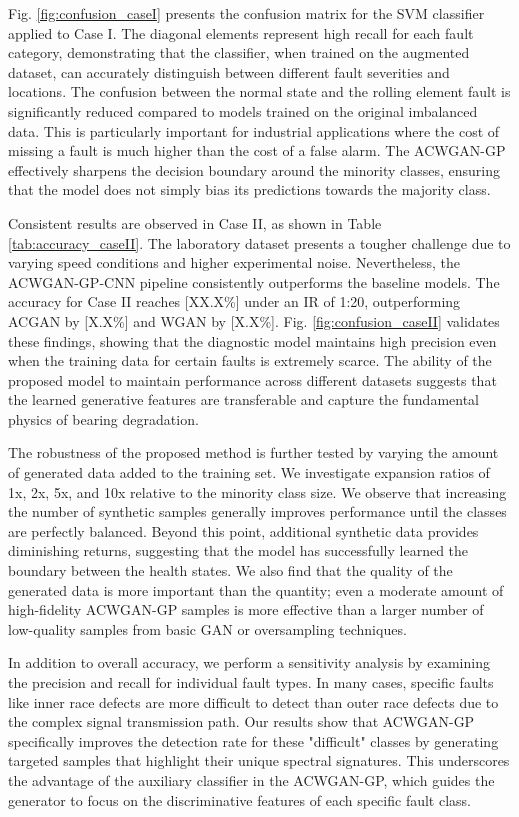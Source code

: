Fig. \ref{fig:confusion_caseI} presents the confusion matrix for the SVM classifier applied to Case I. The diagonal elements represent high recall for each fault category, demonstrating that the classifier, when trained on the augmented dataset, can accurately distinguish between different fault severities and locations. The confusion between the normal state and the rolling element fault is significantly reduced compared to models trained on the original imbalanced data. This is particularly important for industrial applications where the cost of missing a fault is much higher than the cost of a false alarm. The ACWGAN-GP effectively sharpens the decision boundary around the minority classes, ensuring that the model does not simply bias its predictions towards the majority class.

Consistent results are observed in Case II, as shown in Table \ref{tab:accuracy_caseII}. The laboratory dataset presents a tougher challenge due to varying speed conditions and higher experimental noise. Nevertheless, the ACWGAN-GP-CNN pipeline consistently outperforms the baseline models. The accuracy for Case II reaches [XX.X\%] under an IR of 1:20, outperforming ACGAN by [X.X\%] and WGAN by [X.X\%]. Fig. \ref{fig:confusion_caseII} validates these findings, showing that the diagnostic model maintains high precision even when the training data for certain faults is extremely scarce. The ability of the proposed model to maintain performance across different datasets suggests that the learned generative features are transferable and capture the fundamental physics of bearing degradation.

The robustness of the proposed method is further tested by varying the amount of generated data added to the training set. We investigate expansion ratios of 1x, 2x, 5x, and 10x relative to the minority class size. We observe that increasing the number of synthetic samples generally improves performance until the classes are perfectly balanced. Beyond this point, additional synthetic data provides diminishing returns, suggesting that the model has successfully learned the boundary between the health states. We also find that the quality of the generated data is more important than the quantity; even a moderate amount of high-fidelity ACWGAN-GP samples is more effective than a larger number of low-quality samples from basic GAN or oversampling techniques.

In addition to overall accuracy, we perform a sensitivity analysis by examining the precision and recall for individual fault types. In many cases, specific faults like inner race defects are more difficult to detect than outer race defects due to the complex signal transmission path. Our results show that ACWGAN-GP specifically improves the detection rate for these "difficult" classes by generating targeted samples that highlight their unique spectral signatures. This underscores the advantage of the auxiliary classifier in the ACWGAN-GP, which guides the generator to focus on the discriminative features of each specific fault class.

